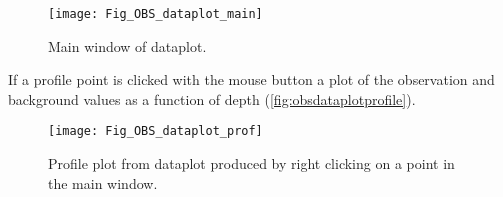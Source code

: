 \documentclass[../tex_main/NEMO_manual]{subfiles}
\begin{document}
\begin{figure}     \begin{center}
\texttt{[image: Fig\_OBS\_dataplot\_main]}
\caption{      \protect\label{fig:obsdataplotmain}
Main window of dataplot.}
\end{center}     \end{figure}

If a profile point is clicked with the mouse button a plot of the observation and background
values as a function of depth (\autoref{fig:obsdataplotprofile}).

\begin{figure}     \begin{center}
\texttt{[image: Fig\_OBS\_dataplot\_prof]}
\caption{      \protect\label{fig:obsdataplotprofile}
Profile plot from dataplot produced by right clicking on a point in the main window.}
\end{center}     \end{figure}
\end{document}
